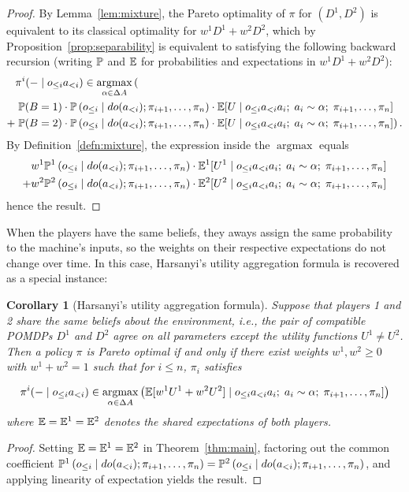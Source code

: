 \documentclass{article}  %
\newcommand{\hist}[1]{o_{\le #1}a_{<#1}}
\newcommand{\dohist}[1]{o_{\le #1} \mid do(a_{<#1})}
\newcommand{\bool}{B}
\newcommand{\lem}[1]{Lemma~\ref{lem:#1}}
\newcommand{\thm}[1]{Theorem~\ref{thm:#1}}
\newcommand{\defn}[1]{Definition~\ref{defn:#1}}
\newcommand{\prop}[1]{Proposition~\ref{prop:#1}}
\DeclareMathOperator*{\argmax}{argmax}
\newtheorem{corollary}[theorem]{Corollary}
\begin{document}
\begin{proof}
By \lem{mixture}, the Pareto optimality of $\pi$ for $(D^1,D^2)$ is equivalent to its classical optimality for
$w^1D^1 + w^2D^2$, which by \prop{separability} is equivalent to satisfying the following backward recursion (writing $\mathbb{P}$ and $\mathbb{E}$ for probabilities and expectations in $w^1D^1 + w^2D^2$):
\begin{align*}
&\pi^i(-\mid\hist{i}) \in \argmax_{\alpha\in\Delta A} \left(\vphantom{\left(\left(\right)\right)}\right.\\
& \left.\PP(\bool =1)\cdot \PP\left(\dohist{i}; \pi_{i+1},\ldots,\pi_n\right)\cdot \EE[U \mid \hist{i} a_i ;\; a_i\sim \alpha;\; \pi_{i+1},\ldots,\pi_n]\right.\\
+ & \left.\PP(\bool =2)\cdot \PP\left(\dohist{i}; \pi_{i+1},\ldots,\pi_n\right)\cdot \EE[U \mid \hist{i} a_i;\; a_i\sim \alpha;\; \pi_{i+1},\ldots,\pi_n] \right).
\end{align*}
By \defn{mixture}, the expression inside the $\argmax$ equals 
\begin{align*}
& w^1 \PP^1\left(\dohist{i}; \pi_{i+1},\ldots,\pi_n\right)\cdot \EE^1[U^1 \mid \hist{i} a_i ;\; a_i\sim \alpha;\; \pi_{i+1},\ldots,\pi_n]\\
+ & w^2 \PP^2\left(\dohist{i}; \pi_{i+1},\ldots,\pi_n\right)\cdot \EE^2[U^2 \mid \hist{i} a_i;\; a_i\sim \alpha;\; \pi_{i+1},\ldots,\pi_n]
\end{align*}
hence the result.
\end{proof}

When the players have the same beliefs, they aways assign the same probability to the machine's inputs, so the weights on their respective expectations do not change over time.  In this case, Harsanyi's utility aggregation formula is recovered as a special instance:

\begin{corollary}[Harsanyi's utility aggregation formula]\label{cor:harsanyi}
Suppose that players 1 and 2 share the same beliefs about the environment, i.e., the pair of compatible POMDPs $D^1$ and $D^2$ agree on all parameters except the utility functions $U^1\neq U^2$. Then a policy $\pi$ is Pareto optimal if and only if there exist weights $w^1,w^2\geq 0$ with $w^1+w^2=1$ such that for $i\le n$, $\pi_i$ satisfies

\[
\pi^i(-\mid\hist{i}) \in \argmax_{\alpha\in\Delta A} \left(\EE[w^1U^1+w^2U^2] \mid \hist{i} a_i ;\; a_i\sim \alpha;\; \pi_{i+1},\ldots,\pi_n]\right)
\]
where $\mathbb{E}=\mathbb{E}^1=\mathbb{E}^2$ denotes the shared expectations of both players.
\end{corollary}
\begin{proof}
Setting $\mathbb{E}=\mathbb{E}^1=\mathbb{E}^2$ in \thm{main}, factoring out the common coefficient $\PP^1\left(\dohist{i}; \pi_{i+1},\ldots,\pi_n\right)=\PP^2\left(\dohist{i}; \pi_{i+1},\ldots,\pi_n\right)$, and applying linearity of expectation yields the result.
\end{proof}
\end{document}
